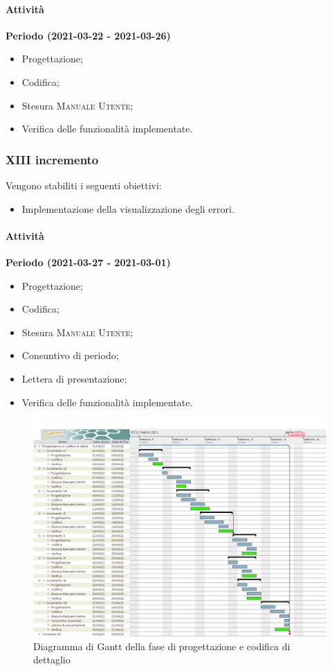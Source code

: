 \documentclass[../piano_di_progetto.tex]{subfiles}
\begin{document}
\paragraph{Attività}
\noindent\textbf{Periodo (2021-03-22 - 2021-03-26)}
\begin{itemize}
    \item Progettazione;
    \item Codifica;
    \item Stesura \textsc{Manuale Utente};
    \item Verifica delle funzionalità implementate.
\end{itemize}


\subsubsection{XIII incremento}
Vengono stabiliti i seguenti obiettivi:
\begin{itemize}
    \item Implementazione della visualizzazione degli errori.
\end{itemize}
\paragraph{Attività}
\noindent\textbf{Periodo (2021-03-27 - 2021-03-01)}
\begin{itemize}
    \item Progettazione;
    \item Codifica;
    \item Stesura \textsc{Manuale Utente};
    \item Consuntivo di periodo;
    \item Lettera di presentazione;
    \item Verifica delle funzionalità implementate.
\end{itemize}


\begin{figure}[H]
\centering
\includegraphics[width=18cm]{src/img/gantt/03_RQ.png}
\caption{Diagramma di Gantt della fase di progettazione e codifica di dettaglio}
\end{figure}
\end{document}
